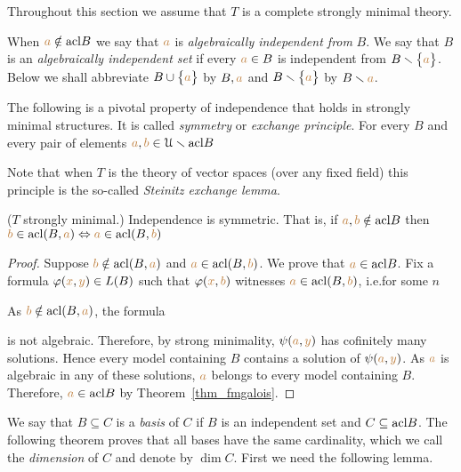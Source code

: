 Throughout this section we assume that $T$ is a complete strongly minimal theory.

When ${\color{brown} a}\notin{\rm acl} B$ we say that ${\color{brown} a}$ is \emph{algebraically independent from\/} $B$.
We say that $B$ is an \emph{algebraically independent set\/} if every ${\color{brown} a}\in B$ is independent from $B\smallsetminus\big\{{\color{brown} a}\big\}$.
Below we shall abbreviate $B\cup\big\{{\color{brown} a}\big\}$ by \emph{$B,{\color{brown} a}$} and  $B\smallsetminus\big\{{\color{brown} a}\big\}$ by \emph{$B\smallsetminus{\color{brown}a}$}.

The following is a pivotal property of independence that holds in strongly minimal structures.
It is called \emph{symmetry\/} or \emph{exchange principle}.
For every $B$ and every pair of elements ${\color{brown} a},{\color{brown} b}\in\EuScript U\smallsetminus{\rm acl} B$


Note that when $T$ is the theory of vector spaces (over any fixed field) this principle is the so-called \emph{Steinitz exchange lemma}.

\begin{theorem}\label{thm_exchange}
($T$ strongly minimal.) Independence is symmetric.
That is, if ${\color{brown} a},{\color{brown} b}\notin{\rm acl} B$ then ${\color{brown} b}\in{\rm acl} (B,{\color{brown} a})\Leftrightarrow{\color{brown}a}\in{\rm acl}(B,{\color{brown} b})$
\end{theorem} 

\begin{proof} 
Suppose ${\color{brown} b}\notin{\rm acl}(B,{\color{brown} a})$ and ${\color{brown} a}\in{\rm acl}(B,{\color{brown} b})$.
We prove that ${\color{brown} a}\in{\rm acl} B$.
Fix a formula $\varphi({\color{brown} x},{\color{brown} y})\in L(B)$ such that $\varphi({\color{brown} x},{\color{brown} b})$ witnesses ${\color{brown} a}\in{\rm acl}(B,{\color{brown} b})$, i.e.\@ for some $n$


As ${\color{brown} b}\notin{\rm acl}(B,{\color{brown} a})$, the formula


is not algebraic.
Therefore, by strong minimality, $\psi({\color{brown} a},{\color{brown} y})$ has cofinitely many solutions.
Hence every model containing $B$ contains a solution of $\psi({\color{brown} a},{\color{brown} y})$.
As ${\color{brown} a}$ is algebraic in any of these solutions, ${\color{brown} a}$ belongs to every model containing $B$.
Therefore, ${\color{brown} a}\in{\rm acl} B$ by Theorem~\ref{thm_fmgalois}.
\end{proof}

We say that $B\subseteq C$ is a \emph{basis\/} of $C$ if $B$ is an independent set and $C\subseteq{\rm acl} B$.
The following theorem proves that all bases have the same cardinality, which we call the  \emph{dimension\/} of $C$ and denote by \emph{$\dim C$}.
First we need the following lemma.

